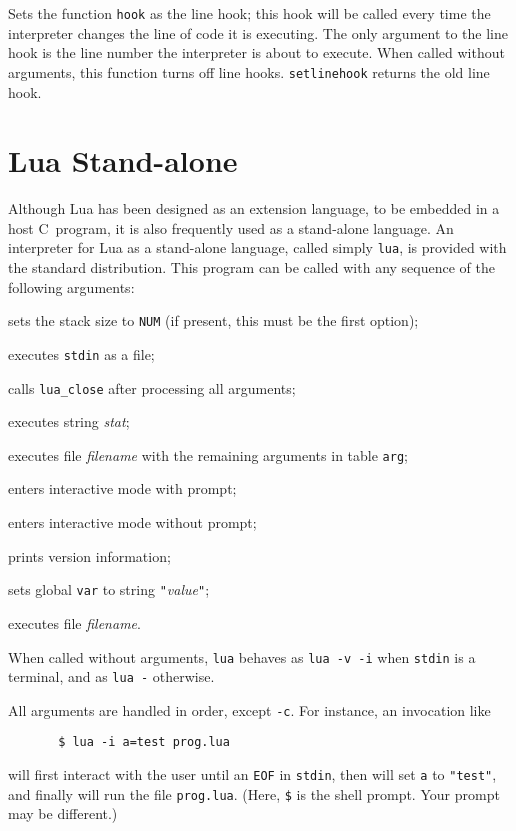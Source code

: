 \documentclass[11pt,twoside,draft]{article}
\makeatletter
\newcommand{\T}[1]{{\tt #1}}
\newcommand{\Index}[1]{#1\index{#1@{\lowercase{#1}}}}
\makeatother
\begin{document}
Sets the function \verb|hook| as the line hook;
this hook will be called every time the interpreter changes
the line of code it is executing.
The only argument to the line hook is the line number the interpreter
is about to execute.
When called without arguments,
this function turns off line hooks.
\verb|setlinehook| returns the old line hook.


\section{\Index{Lua Stand-alone}} \label{lua-sa}

Although Lua has been designed as an extension language,
to be embedded in a host C~program,
it is also frequently used as a stand-alone language.
An interpreter for Lua as a stand-alone language,
called simply \verb|lua|,
is provided with the standard distribution.
This program can be called with any sequence of the following arguments:
\begin{description}\leftskip=20pt
\item[\T{-sNUM}] sets the stack size to \T{NUM}
(if present, this must be the first option);
\item[\T{-} ] executes \verb|stdin| as a file;
\item[\T{-c}] calls \verb|lua_close| after processing all arguments;
\item[\T{-e} \rm\emph{stat}] executes string \emph{stat};
\item[\T{-f} \rm\emph{filename}] executes file \emph{filename} with the
remaining arguments in table \verb|arg|;
\item[\T{-i}] enters interactive mode with prompt;
\item[\T{-q}] enters interactive mode without prompt;
\item[\T{-v}] prints version information;
\item[\T{var=}\rm\emph{value}] sets global \verb|var| to string \verb|"|\emph{value}\verb|"|;
\item[\emph{filename}] executes file \emph{filename}.
\end{description}
When called without arguments,
\verb|lua| behaves as \verb|lua -v -i| when \verb|stdin| is a terminal,
and as \verb|lua -| otherwise.

All arguments are handled in order, except \verb|-c|.
For instance, an invocation like
\begin{verbatim}
       $ lua -i a=test prog.lua
\end{verbatim}
will first interact with the user until an \verb|EOF| in \verb|stdin|,
then will set \verb|a| to \verb|"test"|,
and finally will run the file \verb|prog.lua|.
(Here,
\verb|$| is the shell prompt. Your prompt may be different.)
\end{document}
